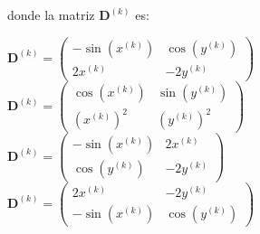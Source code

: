 \begin{pregunta}
\begin{cuerpo}
donde la matriz $\boldsymbol{D}^{(k)}$ es:
\end{cuerpo}
\begin{multicols}{2}
\begin{alternativas}
{$
\boldsymbol{D}^{(k)}=\begin{pmatrix}
-\sin(x^{(k)})& \cos(y^{(k)})\\
2x^{(k)}& -2y^{(k)}
\end{pmatrix}
$}
{$
\boldsymbol{D}^{(k)}=\begin{pmatrix}
\cos(x^{(k)})& \sin(y^{(k)})\\
(x^{(k)})^2& (y^{(k)})^2
\end{pmatrix}
$}
{$
\boldsymbol{D}^{(k)}=\begin{pmatrix}
-\sin(x^{(k)})& 2x^{(k)}\\
\cos(y^{(k)})& -2y^{(k)}
\end{pmatrix}
$}
{$
\boldsymbol{D}^{(k)}=\begin{pmatrix}
2x^{(k)}& -2y^{(k)}\\
-\sin(x^{(k)})& \cos(y^{(k)})
\end{pmatrix}
$}
\end{alternativas}
\end{multicols}
\justificacion{7cm}
\end{pregunta}